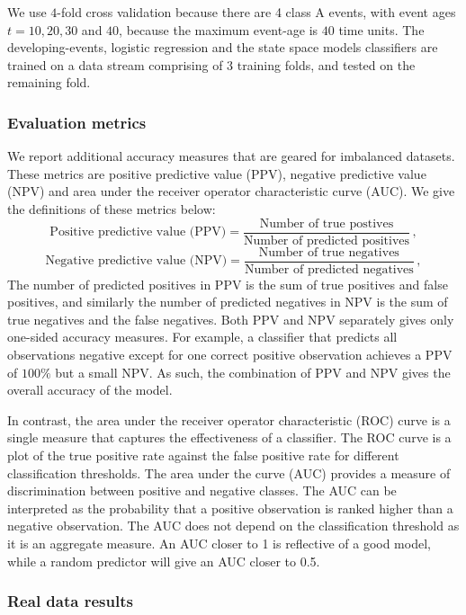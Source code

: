 \documentclass[a4paper,11pt]{article}
\begin{document}
We use $4$-fold cross validation because there are 4 class A events, with event ages $t = 10, 20, 30$ and $40$, because the maximum event-age is $40$ time units. The developing-events, logistic regression and the state space models classifiers are trained on a data stream comprising of 3 training folds, and tested on the remaining fold.

\subsubsection{Evaluation metrics}

We report additional accuracy measures that are geared for imbalanced datasets. These metrics are positive predictive value (PPV), negative predictive value (NPV) and area under the receiver operator characteristic curve (AUC). We give the definitions of these metrics below:
$$
  \text{Positive predictive value (PPV)} = \frac{ \text{Number of true postives} }{ \text{Number of predicted positives} } \, ,
$$
$$
  \text{Negative predictive value (NPV)} = \frac{ \text{Number of true negatives} }{ \text{Number of predicted negatives} } \, ,
$$
The number of predicted positives in PPV is the sum of true positives and false positives, and similarly the number of predicted negatives in NPV is the sum of true negatives and the false negatives. Both PPV and NPV separately gives only one-sided accuracy measures. For example, a classifier that predicts all observations negative except for one correct positive observation achieves a PPV of $100\%$ but a small NPV. As such, the combination of PPV and NPV gives the overall accuracy of the model.

In contrast, the area under the receiver operator characteristic (ROC) curve is a single measure that captures the effectiveness of a classifier. The ROC curve is a plot of the true positive rate against the false positive rate for different classification thresholds. The area under the curve (AUC) provides a measure of discrimination between positive and negative classes. The AUC can be interpreted as the probability that a positive observation is ranked higher than a negative observation. The AUC does not depend on the classification threshold as it is an aggregate measure. An AUC closer to 1 is reflective of a good model, while a random predictor will give an AUC closer to 0.5.

\subsubsection{Real data results}
\end{document}
